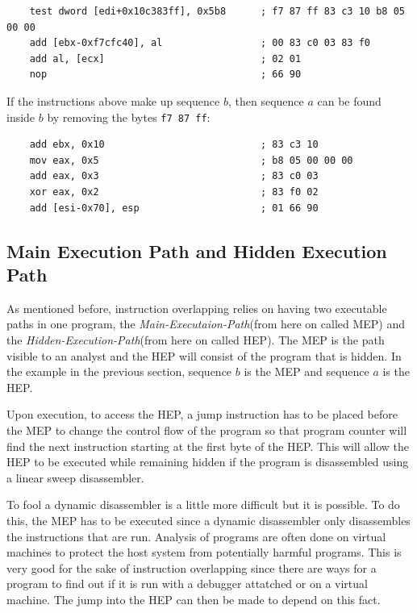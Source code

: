 \documentclass[11pt,twoside]{eitExjobb}
\begin{document}
\begin{verbatim}
    test dword [edi+0x10c383ff], 0x5b8      ; f7 87 ff 83 c3 10 b8 05 00 00
    add [ebx-0xf7cfc40], al                 ; 00 83 c0 03 83 f0
    add al, [ecx]                           ; 02 01
    nop                                     ; 66 90
\end{verbatim}

\noindent If the instructions above make up sequence $b$, then sequence $a$ can be found inside $b$ by removing the bytes \texttt{f7 87 ff}:

\begin{verbatim}
    add ebx, 0x10                           ; 83 c3 10
    mov eax, 0x5                            ; b8 05 00 00 00
    add eax, 0x3                            ; 83 c0 03
    xor eax, 0x2                            ; 83 f0 02
    add [esi-0x70], esp                     ; 01 66 90
\end{verbatim}

\subsection{Main Execution Path and Hidden Execution Path} 
As mentioned before, instruction overlapping relies on having two executable paths in one program, the \emph{Main-Executaion-Path}(from here on called MEP) and the \emph{Hidden-Execution-Path}(from here on called HEP). The MEP is the path visible to an analyst and the HEP will consist of the program that is hidden. In the example in the previous section, sequence $b$ is the MEP and sequence $a$ is the HEP.

Upon execution, to access the HEP, a jump instruction has to be placed before the MEP to change the control flow of the program so that program counter will find the next instruction starting at the first byte of the HEP. This will allow the HEP to be executed while remaining hidden if the program is disassembled using a linear sweep disassembler. 

To fool a dynamic disassembler is a little more difficult but it is possible. To do this, the MEP has to be executed since a dynamic disassembler only disassembles the instructions that are run. Analysis of programs are often done on virtual machines to protect the host system from potentially harmful programs. This is very good for the sake of instruction overlapping since there are ways for a program to find out if it is run with a debugger attatched or on a virtual machine. The jump into the HEP can then be made to depend on this fact.
\end{document}
